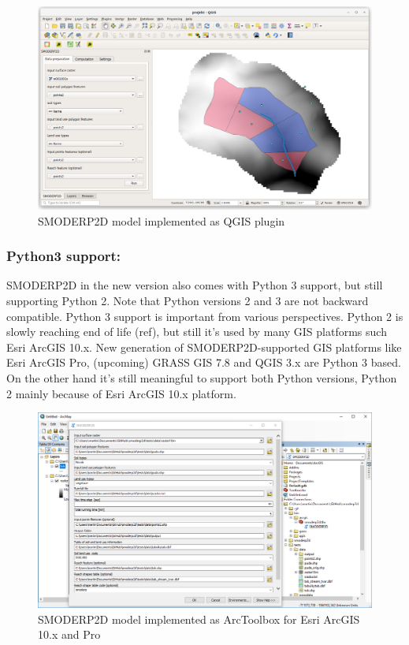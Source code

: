 \begin{figure}[ht!]
  \begin{center}
    \includegraphics[width=1.0\columnwidth]{figures/smoderp2d_qgis.png}
    \caption{SMODERP2D model implemented as QGIS plugin}
    \label{fig:uml_diagram}
  \end{center}
\end{figure}

\subsubsection{Python3 support:}
SMODERP2D in the new version also comes with Python 3 support, but
still supporting Python 2. Note that Python versions 2 and 3 are not
backward compatible.  Python 3 support is important from various
perspectives. Python 2 is slowly reaching end of life (ref), but still
it’s used by many GIS platforms such Esri ArcGIS 10.x. New generation
of SMODERP2D-supported GIS platforms like Esri ArcGIS Pro, (upcoming)
GRASS GIS 7.8 and QGIS 3.x are Python 3 based. On the other hand it’s
still meaningful to support both Python versions, Python 2 mainly
because of Esri ArcGIS 10.x platform.

\begin{figure}[ht!]
  \begin{center}
    \includegraphics[width=1.0\columnwidth]{figures/smoderp2d_arcgis.png}
    \caption{SMODERP2D model implemented as ArcToolbox for Esri ArcGIS
      10.x and Pro}
    \label{fig:uml_diagram}
  \end{center}
\end{figure}
